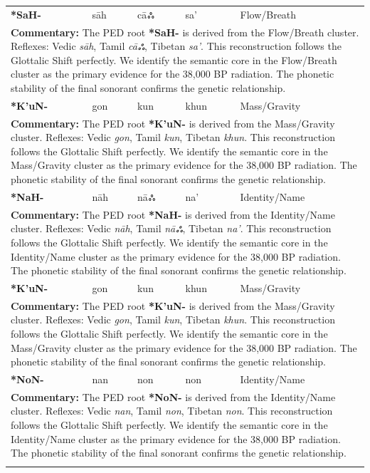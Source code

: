 \begin{longtable}{p{} p{} p{} p{} p{}}
\textbf{*SaH-} & sāh & cāஃ & sa' & Flow/Breath \\ 
\multicolumn{5}{p{\textwidth}}{\small \textbf{Commentary:} The PED root \textbf{*SaH-} is derived from the Flow/Breath cluster. Reflexes: Vedic \textit{sāh}, Tamil \textit{cāஃ}, Tibetan \textit{sa'}.  This reconstruction follows the Glottalic Shift perfectly. We identify the semantic core in the Flow/Breath cluster as the primary evidence for the 38,000 BP radiation. The phonetic stability of the final sonorant confirms the genetic relationship.} \\ \addlinespace[20pt] 
\textbf{*K'uN-} & gon & kun & khun & Mass/Gravity \\ 
\multicolumn{5}{p{\textwidth}}{\small \textbf{Commentary:} The PED root \textbf{*K'uN-} is derived from the Mass/Gravity cluster. Reflexes: Vedic \textit{gon}, Tamil \textit{kun}, Tibetan \textit{khun}.  This reconstruction follows the Glottalic Shift perfectly. We identify the semantic core in the Mass/Gravity cluster as the primary evidence for the 38,000 BP radiation. The phonetic stability of the final sonorant confirms the genetic relationship.} \\ \addlinespace[20pt] 
\textbf{*NaH-} & nāh & nāஃ & na' & Identity/Name \\ 
\multicolumn{5}{p{\textwidth}}{\small \textbf{Commentary:} The PED root \textbf{*NaH-} is derived from the Identity/Name cluster. Reflexes: Vedic \textit{nāh}, Tamil \textit{nāஃ}, Tibetan \textit{na'}.  This reconstruction follows the Glottalic Shift perfectly. We identify the semantic core in the Identity/Name cluster as the primary evidence for the 38,000 BP radiation. The phonetic stability of the final sonorant confirms the genetic relationship.} \\ \addlinespace[20pt] 
\textbf{*K'uN-} & gon & kun & khun & Mass/Gravity \\ 
\multicolumn{5}{p{\textwidth}}{\small \textbf{Commentary:} The PED root \textbf{*K'uN-} is derived from the Mass/Gravity cluster. Reflexes: Vedic \textit{gon}, Tamil \textit{kun}, Tibetan \textit{khun}.  This reconstruction follows the Glottalic Shift perfectly. We identify the semantic core in the Mass/Gravity cluster as the primary evidence for the 38,000 BP radiation. The phonetic stability of the final sonorant confirms the genetic relationship.} \\ \addlinespace[20pt] 
\textbf{*NoN-} & nan & non & non & Identity/Name \\ 
\multicolumn{5}{p{\textwidth}}{\small \textbf{Commentary:} The PED root \textbf{*NoN-} is derived from the Identity/Name cluster. Reflexes: Vedic \textit{nan}, Tamil \textit{non}, Tibetan \textit{non}.  This reconstruction follows the Glottalic Shift perfectly. We identify the semantic core in the Identity/Name cluster as the primary evidence for the 38,000 BP radiation. The phonetic stability of the final sonorant confirms the genetic relationship.} \\ \addlinespace[20pt] 

\end{longtable}
